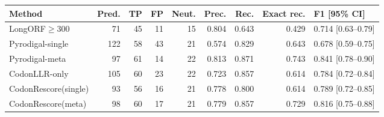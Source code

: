 \begin{tabular}{lrrrrrrrl}
\toprule
Method & Pred. & TP & FP & Neut. & Prec. & Rec. & Exact rec. & F1 [95\% CI] \\
\midrule
LongORF$\geq$300 & 71 & 45 & 11 & 15 & 0.804 & 0.643 & 0.429 & 0.714 [0.63--0.79] \\
Pyrodigal-single & 122 & 58 & 43 & 21 & 0.574 & 0.829 & 0.643 & 0.678 [0.59--0.75] \\
Pyrodigal-meta & 97 & 61 & 14 & 22 & 0.813 & 0.871 & 0.743 & 0.841 [0.78--0.90] \\
CodonLLR-only & 105 & 60 & 23 & 22 & 0.723 & 0.857 & 0.614 & 0.784 [0.72--0.84] \\
CodonRescore(single) & 93 & 56 & 16 & 21 & 0.778 & 0.800 & 0.614 & 0.789 [0.72--0.85] \\
CodonRescore(meta) & 98 & 60 & 17 & 21 & 0.779 & 0.857 & 0.729 & 0.816 [0.75--0.88] \\
\bottomrule
\end{tabular}

